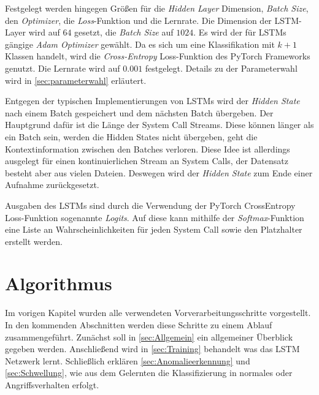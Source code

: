         Festgelegt werden hingegen Größen für die \textit{Hidden Layer} Dimension, \textit{Batch Size}, den \textit{Optimizer}, die \textit{Loss}-Funktion und die Lernrate.
        Die Dimension der \ac{LSTM}-Layer wird auf $64$ gesetzt, die \textit{Batch Size} auf $1024$.
        Es wird der für \acp{LSTM} gängige \textit{Adam Optimizer} gewählt.
        Da es sich um eine Klassifikation mit $k+1$ Klassen handelt, wird die \textit{Cross-Entropy} Loss-Funktion des PyTorch Frameworks genutzt.
        Die Lernrate wird auf $0.001$ festgelegt.
        Details zu der Parameterwahl wird in \autoref{sec:parameterwahl} erläutert.

        Entgegen der typischen Implementierungen von \acp{LSTM} wird der \textit{Hidden State} nach einem Batch gespeichert und dem nächsten Batch  übergeben. 
        Der Hauptgrund dafür ist die Länge der System Call Streams.
        Diese können länger als ein Batch sein, werden die Hidden States nicht übergeben, geht die Kontextinformation zwischen den Batches verloren.
        Diese Idee ist allerdings ausgelegt für einen kontinuierlichen Stream an System Calls, der Datensatz besteht aber aus vielen Dateien.
        Deswegen wird der \textit{Hidden State} zum Ende einer Aufnahme zurückgesetzt.

        Ausgaben des \acp{LSTM} sind durch die Verwendung der PyTorch CrossEntropy Loss-Funktion sogenannte \textit{Logits}.
        Auf diese kann mithilfe der \textit{Softmax}-Funktion eine Liste an Wahrscheinlichkeiten für jeden System Call sowie den Platzhalter erstellt werden.

    \section{Algorithmus}\label{sec:Algorithmus}
        Im vorigen Kapitel wurden alle verwendeten Vorverarbeitungsschritte vorgestellt.
        In den kommenden Abschnitten werden diese Schritte zu einem Ablauf zusammengeführt.
        Zunächst soll in \autoref{sec:Allgemein} ein allgemeiner Überblick gegeben werden.
        Anschließend wird in \autoref{sec:Training} behandelt was das \ac{LSTM} Netzwerk lernt.
        Schließlich erklären \autoref{sec:Anomalieerkennung} und \autoref{sec:Schwellung}, wie aus dem Gelernten die Klassifizierung in normales oder Angriffsverhalten erfolgt.


